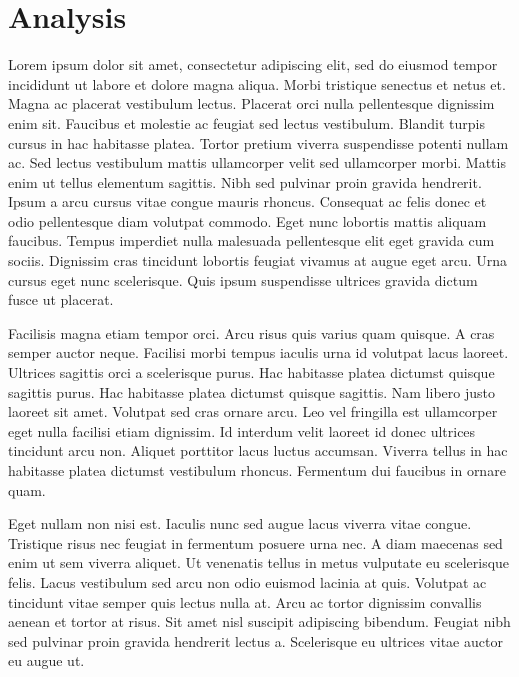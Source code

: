 \documentclass[12pt, oneside, a4paper]{article}
\begin{document}
\section*{Analysis}
Lorem ipsum dolor sit amet, consectetur adipiscing elit, sed do eiusmod tempor incididunt ut labore et dolore magna aliqua. Morbi tristique senectus et netus et. Magna ac placerat vestibulum lectus. Placerat orci nulla pellentesque dignissim enim sit. Faucibus et molestie ac feugiat sed lectus vestibulum. Blandit turpis cursus in hac habitasse platea. Tortor pretium viverra suspendisse potenti nullam ac. Sed lectus vestibulum mattis ullamcorper velit sed ullamcorper morbi. Mattis enim ut tellus elementum sagittis. Nibh sed pulvinar proin gravida hendrerit. Ipsum a arcu cursus vitae congue mauris rhoncus. Consequat ac felis donec et odio pellentesque diam volutpat commodo. Eget nunc lobortis mattis aliquam faucibus. Tempus imperdiet nulla malesuada pellentesque elit eget gravida cum sociis. Dignissim cras tincidunt lobortis feugiat vivamus at augue eget arcu. Urna cursus eget nunc scelerisque. Quis ipsum suspendisse ultrices gravida dictum fusce ut placerat.

Facilisis magna etiam tempor orci. Arcu risus quis varius quam quisque. A cras semper auctor neque. Facilisi morbi tempus iaculis urna id volutpat lacus laoreet. Ultrices sagittis orci a scelerisque purus. Hac habitasse platea dictumst quisque sagittis purus. Hac habitasse platea dictumst quisque sagittis. Nam libero justo laoreet sit amet. Volutpat sed cras ornare arcu. Leo vel fringilla est ullamcorper eget nulla facilisi etiam dignissim. Id interdum velit laoreet id donec ultrices tincidunt arcu non. Aliquet porttitor lacus luctus accumsan. Viverra tellus in hac habitasse platea dictumst vestibulum rhoncus. Fermentum dui faucibus in ornare quam.

Eget nullam non nisi est. Iaculis nunc sed augue lacus viverra vitae congue. Tristique risus nec feugiat in fermentum posuere urna nec. A diam maecenas sed enim ut sem viverra aliquet. Ut venenatis tellus in metus vulputate eu scelerisque felis. Lacus vestibulum sed arcu non odio euismod lacinia at quis. Volutpat ac tincidunt vitae semper quis lectus nulla at. Arcu ac tortor dignissim convallis aenean et tortor at risus. Sit amet nisl suscipit adipiscing bibendum. Feugiat nibh sed pulvinar proin gravida hendrerit lectus a. Scelerisque eu ultrices vitae auctor eu augue ut.
\end{document}
